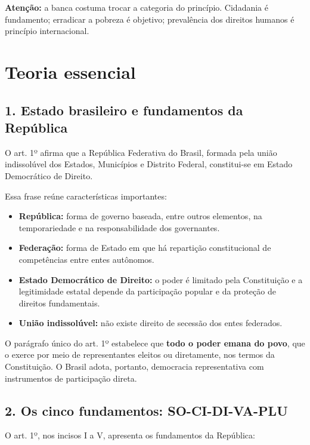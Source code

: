 \documentclass[11pt,a4paper]{article}
\begin{document}
\textbf{Atenção:} a banca costuma trocar a categoria do princípio. Cidadania é fundamento; erradicar a pobreza é objetivo; prevalência dos direitos humanos é princípio internacional.

\section*{Teoria essencial}

\subsection*{1. Estado brasileiro e fundamentos da República}

O art. 1º afirma que a República Federativa do Brasil, formada pela união indissolúvel dos Estados, Municípios e Distrito Federal, constitui-se em Estado Democrático de Direito.

Essa frase reúne características importantes:

\begin{itemize}
  \item \textbf{República:} forma de governo baseada, entre outros elementos, na temporariedade e na responsabilidade dos governantes.
  \item \textbf{Federação:} forma de Estado em que há repartição constitucional de competências entre entes autônomos.
  \item \textbf{Estado Democrático de Direito:} o poder é limitado pela Constituição e a legitimidade estatal depende da participação popular e da proteção de direitos fundamentais.
  \item \textbf{União indissolúvel:} não existe direito de secessão dos entes federados.
\end{itemize}

O parágrafo único do art. 1º estabelece que \textbf{todo o poder emana do povo}, que o exerce por meio de representantes eleitos ou diretamente, nos termos da Constituição. O Brasil adota, portanto, democracia representativa com instrumentos de participação direta.

\subsection*{2. Os cinco fundamentos: SO-CI-DI-VA-PLU}

O art. 1º, nos incisos I a V, apresenta os fundamentos da República:
\end{document}
